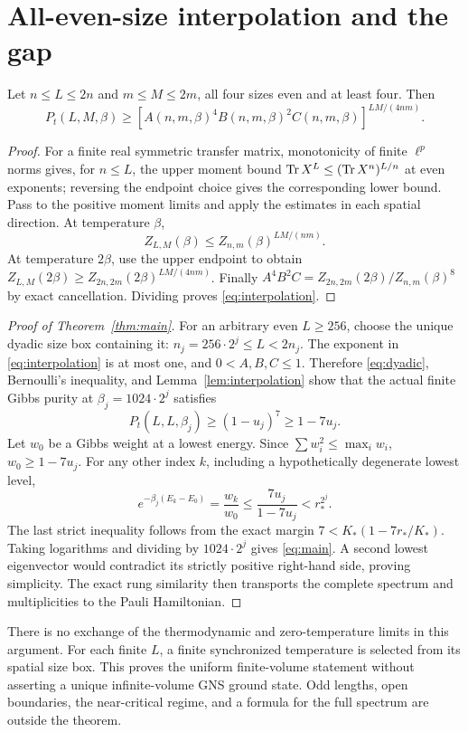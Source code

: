 \section{All-even-size interpolation and the gap}\label{sec:allsize}
\begin{lemma}\label{lem:interpolation}
Let $n\le L\le2n$ and $m\le M\le2m$, all four sizes even and at least four.
Then
\begin{equation}\label{eq:interpolation}
 P_t(L,M,\beta)\ge
 [A(n,m,\beta)^4B(n,m,\beta)^2C(n,m,\beta)]^{LM/(4nm)}.
\end{equation}
\end{lemma}
\begin{proof}
For a finite real symmetric transfer matrix, monotonicity of finite
$\ell^p$ norms gives, for $n\le L$, the upper moment bound
$\operatorname{Tr} X^L\le(\operatorname{Tr} X^n)^{L/n}$ at even exponents; reversing the endpoint choice
gives the corresponding lower bound. Pass to the positive moment limits
and apply the estimates in each spatial direction. At temperature $\beta$,
\[
 Z_{L,M}(\beta)\le Z_{n,m}(\beta)^{LM/(nm)}.
\]
At temperature $2\beta$, use the upper endpoint to obtain
$Z_{L,M}(2\beta)\ge Z_{2n,2m}(2\beta)^{LM/(4nm)}$.
Finally
$A^4B^2C=Z_{2n,2m}(2\beta)/Z_{n,m}(\beta)^8$ by exact cancellation.
Dividing proves \eqref{eq:interpolation}.
\end{proof}

\begin{proof}[Proof of Theorem~\ref{thm:main}]
For an arbitrary even $L\ge256$, choose the unique dyadic size box containing
it: $n_j=256\cdot2^j\le L<2n_j$. The exponent in
\eqref{eq:interpolation} is at most one, and $0<A,B,C\le1$. Therefore
\eqref{eq:dyadic}, Bernoulli's inequality, and Lemma~\ref{lem:interpolation}
show that the actual finite Gibbs purity at $\beta_j=1024\cdot2^j$ satisfies
\begin{equation}\label{eq:thermalpurityfinal}
 P_t(L,L,\beta_j)\ge(1-u_j)^7\ge1-7u_j.
\end{equation}
Let $w_0$ be a Gibbs weight at a lowest energy. Since $\sum w_i^2\le\max_iw_i$,
$w_0\ge1-7u_j$. For any other index $k$, including a hypothetically degenerate
lowest level,
\[
 e^{-\beta_j(E_k-E_0)}=\frac{w_k}{w_0}
 \le\frac{7u_j}{1-7u_j}<r_*^{2^j}.
\]
The last strict inequality follows from the exact margin
$7<K_*(1-7r_*/K_*)$. Taking logarithms and dividing by $1024\cdot2^j$ gives
\eqref{eq:main}. A second lowest eigenvector would contradict its strictly
positive right-hand side, proving simplicity. The exact rung similarity then
transports the complete spectrum and multiplicities to the Pauli Hamiltonian.
\end{proof}

There is no exchange of the thermodynamic and zero-temperature limits in this
argument. For each finite $L$, a finite synchronized temperature is selected
from its spatial size box. This proves the uniform finite-volume statement
without asserting a unique infinite-volume GNS ground state. Odd lengths,
open boundaries, the near-critical regime, and a formula for the full spectrum
are outside the theorem.
